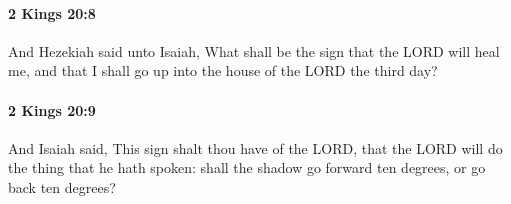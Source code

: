 		\paragraph{2 Kings 20:8} %
			\label{2KINGS-20-8}

			And Hezekiah said unto Isaiah, What shall be the sign that the LORD will heal me, and that I shall go up into the house of the LORD the third day?


		\paragraph{2 Kings 20:9} %
			\label{2KINGS-20-9}

			And Isaiah said, This sign shalt thou have of the LORD, that the LORD will do the thing that he hath spoken: shall the shadow go forward ten degrees, or go back ten degrees?


